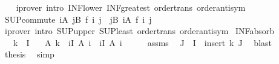 \begin{isabellebody}
%
\isadelimproof
\ \ %
\endisadelimproof
%
\isatagproof
{}\isamarkupfalse%
\ {\isacharparenleft}{\kern0pt}iprover\ intro{\isacharcolon}{\kern0pt}\ INF{\isacharunderscore}{\kern0pt}lower\ INF{\isacharunderscore}{\kern0pt}greatest\ order{\isacharunderscore}{\kern0pt}trans\ order{\isachardot}{\kern0pt}antisym{\isacharparenright}{\kern0pt}%
\endisatagproof
{\isafoldproof}%
%
\isadelimproof
\isanewline
%
\endisadelimproof
\isanewline
{}\isamarkupfalse%
\ SUP{\isacharunderscore}{\kern0pt}commute{\isacharcolon}{\kern0pt}\ {\isachardoublequoteopen}{\isacharparenleft}{\kern0pt}{\isasymSqunion}i{\isasymin}A{\isachardot}{\kern0pt}\ {\isasymSqunion}j{\isasymin}B{\isachardot}{\kern0pt}\ f\ i\ j{\isacharparenright}{\kern0pt}\ {\isacharequal}{\kern0pt}\ {\isacharparenleft}{\kern0pt}{\isasymSqunion}j{\isasymin}B{\isachardot}{\kern0pt}\ {\isasymSqunion}i{\isasymin}A{\isachardot}{\kern0pt}\ f\ i\ j{\isacharparenright}{\kern0pt}{\isachardoublequoteclose}\isanewline
%
\isadelimproof
\ \ %
\endisadelimproof
%
\isatagproof
{}\isamarkupfalse%
\ {\isacharparenleft}{\kern0pt}iprover\ intro{\isacharcolon}{\kern0pt}\ SUP{\isacharunderscore}{\kern0pt}upper\ SUP{\isacharunderscore}{\kern0pt}least\ order{\isacharunderscore}{\kern0pt}trans\ order{\isachardot}{\kern0pt}antisym{\isacharparenright}{\kern0pt}%
\endisatagproof
{\isafoldproof}%
%
\isadelimproof
\isanewline
%
\endisadelimproof
\isanewline
{}\isamarkupfalse%
\ INF{\isacharunderscore}{\kern0pt}absorb{\isacharcolon}{\kern0pt}\isanewline
\ \ \ {\isachardoublequoteopen}k\ {\isasymin}\ I{\isachardoublequoteclose}\isanewline
\ \ \ {\isachardoublequoteopen}A\ k\ {\isasymsqinter}\ {\isacharparenleft}{\kern0pt}{\isasymSqinter}i{\isasymin}I{\isachardot}{\kern0pt}\ A\ i{\isacharparenright}{\kern0pt}\ {\isacharequal}{\kern0pt}\ {\isacharparenleft}{\kern0pt}{\isasymSqinter}i{\isasymin}I{\isachardot}{\kern0pt}\ A\ i{\isacharparenright}{\kern0pt}{\isachardoublequoteclose}\isanewline
%
\isadelimproof
%
\endisadelimproof
%
\isatagproof
{}\isamarkupfalse%
\ {\isacharminus}{\kern0pt}\isanewline
\ \ \isamarkupfalse%
\ assms\ \isamarkupfalse%
\ J\ \ {\isachardoublequoteopen}I\ {\isacharequal}{\kern0pt}\ insert\ k\ J{\isachardoublequoteclose}\ \isamarkupfalse%
\ blast\isanewline
\ \ \isamarkupfalse%
\ \isamarkupfalse%
\ {\isacharquery}{\kern0pt}thesis\ \isamarkupfalse%
\ simp\isanewline
{}\isamarkupfalse%
%

\end{isabellebody}
